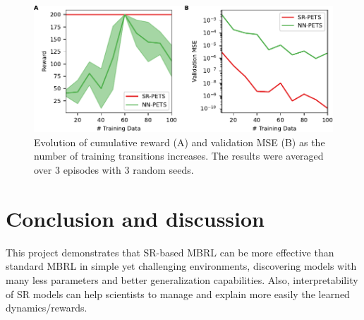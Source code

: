 \documentclass[11pt]{article}
\begin{document}
\begin{figure}
	\centering
	\includegraphics{cartpole.pdf}
	\caption{Evolution of cumulative reward (A) and validation MSE (B) as the number of training transitions increases. The results were averaged over 3 episodes with 3 random seeds.}
	\label{fig: cartpole}
\end{figure}


\section{Conclusion and discussion}
This project demonstrates that SR-based MBRL can be more effective than standard MBRL in simple yet challenging environments, discovering models with many less parameters and better generalization capabilities. Also, interpretability of SR models can help scientists to manage and explain more easily the learned dynamics/rewards.
\end{document}
